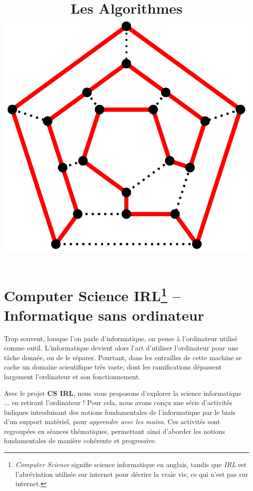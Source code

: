 \documentclass[a5paper,pagesize,DIV=14]{scrbook}
\title{Les Algorithmes \\ \includegraphics[width=0.7\linewidth]{img/Hamiltonian_path.pdf} \label{img:hamiltonian}}
\date{}
\begin{document}
\maketitle

\chapter*{Computer Science IRL\footnote{\textit{Computer Science} signifie science informatique en anglais, tandis que \textit{IRL} est l'abréviation utilisée sur internet pour décrire la vraie vie, ce qui n'est pas sur internet.} -- Informatique sans ordinateur}


Trop souvent, lorsque l'on parle d'informatique, on pense à l'ordinateur utilisé comme outil. L'informatique devient alors l'art d'utiliser l'ordinateur pour une tâche donnée, ou de le réparer. Pourtant, dans les entrailles de cette machine se cache un domaine scientifique très vaste, dont les ramifications dépassent largement l'ordinateur et son fonctionnement.

Avec le projet \textbf{CS IRL}, nous vous proposons d'explorer la science informatique ... en retirant l'ordinateur ! Pour cela, nous avons conçu une série d'activités ludiques introduisant des notions fondamentales de l'informatique par le biais d'un support matériel, pour \textit{apprendre avec les mains}. Ces activités sont regroupées en séances thématiques, permettant ainsi d'aborder les notions fondamentales de manière cohérente et progressive.
\end{document}
